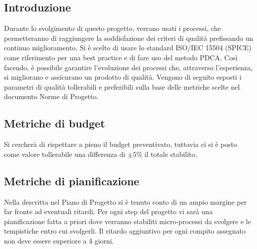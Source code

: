 \documentclass[../piano_di_qualifica.tex]{subfiles}
\begin{document}
\subsection{Introduzione}
Durante lo svolgimento di questo progetto, verrano usati i processi, che permetteranno di raggiungere la soddisfazione dei criteri di qualità prefissando un continuo miglioramento. Si è scelto di usare lo standard ISO/IEC 15504 (SPICE) come riferimento per una best practice e di fare uso del metodo PDCA. Così facendo, è possibile garantire l'evoluzione dei processi che, attraverso l'esperienza, si migliorano e assicurano un prodotto di qualità. Vengono di seguito esposti i parametri di qualità tollerabili e preferibili sulla base delle metriche scelte nel documento Norme di Progetto.

\subsection{Metriche di budget}
\label{sub:metr_bud}
Si cercherà di rispettare a pieno il budget preventivato, tuttavia ci si è posto come valore tollerabile una differenza di ${\pm 5\%}$ il totale stabilito.

\subsection{Metriche di pianificazione}
\label{sub: metr_pianif}
Nella  descritta nel Piano di Progetto si è tenuto conto di un ampio margine per far fronte ad eventuali ritardi. Per ogni step del progetto vi sarà una pianificazione fatta a priori dove verranno stabiliti micro-processi da svolgere e le tempistiche entro cui svolgerli. Il ritardo aggiuntivo per ogni compito assegnato non deve essere superiore a 4 giorni. 

\end{document}
